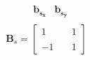 \documentclass[preview]{standalone}
\begin{document}
\begin{align*}
\begin{array}{c}\begin{matrix}\hspace{1cm} \mathbf{b_{s_x}} & \mathbf{b_{s_y}} \end{matrix} \\  \mathbf{B}_s = \begin{bmatrix} 1 & \quad 1 \\ \\-1 & \quad 1 \end{bmatrix} \end{array}
\end{align*}
\end{document}
